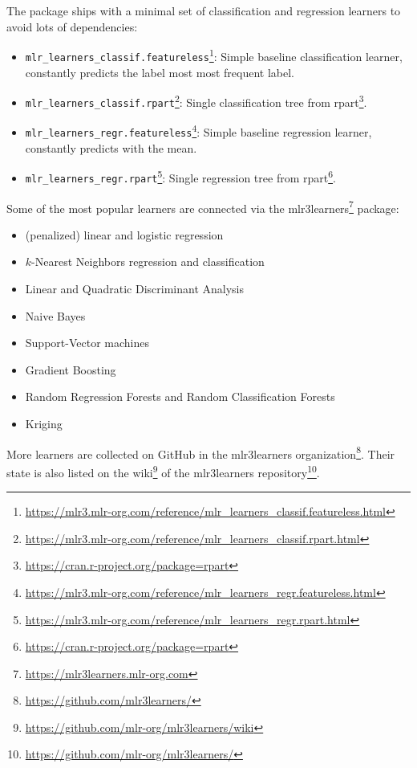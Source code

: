 \documentclass[12pt,]{scrbook}
\providecommand{\tightlist}{%
  \setlength{\itemsep}{0pt}\setlength{\parskip}{0pt}}
\renewcommand{\href}[2]{#2\footnote{\url{#1}}}
\begin{document}
The package ships with a minimal set of classification and regression learners to avoid lots of dependencies:

\begin{itemize}
\tightlist
\item
  \href{https://mlr3.mlr-org.com/reference/mlr_learners_classif.featureless.html}{\texttt{mlr\_learners\_classif.featureless}}: Simple baseline classification learner, constantly predicts the label most most frequent label.
\item
  \href{https://mlr3.mlr-org.com/reference/mlr_learners_classif.rpart.html}{\texttt{mlr\_learners\_classif.rpart}}: Single classification tree from \href{https://cran.r-project.org/package=rpart}{rpart}.
\item
  \href{https://mlr3.mlr-org.com/reference/mlr_learners_regr.featureless.html}{\texttt{mlr\_learners\_regr.featureless}}: Simple baseline regression learner, constantly predicts with the mean.
\item
  \href{https://mlr3.mlr-org.com/reference/mlr_learners_regr.rpart.html}{\texttt{mlr\_learners\_regr.rpart}}: Single regression tree from \href{https://cran.r-project.org/package=rpart}{rpart}.
\end{itemize}

Some of the most popular learners are connected via the \href{https://mlr3learners.mlr-org.com}{mlr3learners} package:

\begin{itemize}
\tightlist
\item
  (penalized) linear and logistic regression
\item
  \(k\)-Nearest Neighbors regression and classification
\item
  Linear and Quadratic Discriminant Analysis
\item
  Naive Bayes
\item
  Support-Vector machines
\item
  Gradient Boosting
\item
  Random Regression Forests and Random Classification Forests
\item
  Kriging
\end{itemize}

More learners are collected on GitHub in the \href{https://github.com/mlr3learners/}{mlr3learners organization}.
Their state is also listed on the \href{https://github.com/mlr-org/mlr3learners/wiki}{wiki} of the \href{https://github.com/mlr-org/mlr3learners/}{mlr3learners repository}.
\end{document}
